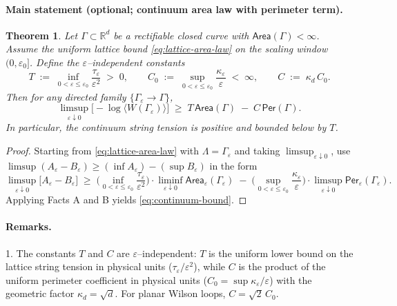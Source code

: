 \documentclass[11pt]{amsart}
\theoremstyle{plain}
\newtheorem{theorem}{Theorem}[section]
\theoremstyle{definition}
\theoremstyle{remark}
\renewcommand{\tfrac}[2]{\textstyle\frac{#1}{#2}}
\begin{document}
\paragraph{Main statement (optional; continuum area law with perimeter term).}
\begin{theorem}
Let $\Gamma\subset\mathbb{R}^d$ be a rectifiable closed curve with $\mathsf{Area}(\Gamma)<\infty$. Assume the uniform lattice bound \eqref{eq:lattice-area-law} on the scaling window $(0,\varepsilon_0]$. Define the $\varepsilon$--independent constants
\[
  T\;:=\;\inf_{0<\varepsilon\le\varepsilon_0}\frac{\tau_\varepsilon}{\varepsilon^2}\;>\;0,\qquad
  C_0\;:=\;\sup_{0<\varepsilon\le\varepsilon_0}\frac{\kappa_\varepsilon}{\varepsilon}\;<\;\infty,\qquad
  C\;:=\;\kappa_d\,C_0.
\]
Then for any directed family $\{\Gamma_\varepsilon\to\Gamma\}$,
\begin{equation}
\label{eq:continuum-bound}
  \limsup_{\varepsilon\downarrow 0}\bigl[-\log\langle W(\Gamma_\varepsilon)\rangle\bigr]
  \;\ge\;
  T\,\mathsf{Area}(\Gamma)\;-
  \;C\,\mathsf{Per}(\Gamma).
\end{equation}
In particular, the continuum string tension is positive and bounded below by $T$.
\end{theorem}

\begin{proof}
Starting from \eqref{eq:lattice-area-law} with $\Lambda=\Gamma_\varepsilon$ and taking $\limsup_{\varepsilon\downarrow 0}$, use $\limsup(A_\varepsilon-B_\varepsilon)\ge (\inf A_\varepsilon)-(\sup B_\varepsilon)$ in the form
\[
  \limsup_{\varepsilon\downarrow 0}\bigl[A_\varepsilon-B_\varepsilon\bigr]
  \;\ge\;
  \Big(\inf_{0<\varepsilon\le\varepsilon_0}\tfrac{\tau_\varepsilon}{\varepsilon^2}\Big)\cdot
  \liminf_{\varepsilon\downarrow 0}\mathsf{Area}_\varepsilon(\Gamma_\varepsilon)
  \;-
  \;\Big(\sup_{0<\varepsilon\le\varepsilon_0}\tfrac{\kappa_\varepsilon}{\varepsilon}\Big)\cdot
  \limsup_{\varepsilon\downarrow 0}\mathsf{Per}_\varepsilon(\Gamma_\varepsilon).
\]
Applying Facts A and B yields \eqref{eq:continuum-bound}.
\end{proof}

\paragraph{Remarks.}
1. The constants $T$ and $C$ are $\varepsilon$--independent: $T$ is the uniform lower bound on the lattice string tension in physical units ($\tau_\varepsilon/\varepsilon^2$), while $C$ is the product of the uniform perimeter coefficient in physical units ($C_0=\sup\kappa_\varepsilon/\varepsilon$) with the geometric factor $\kappa_d=\sqrt{d}$. For planar Wilson loops, $C=\sqrt{2}\,C_0$.
\end{document}
